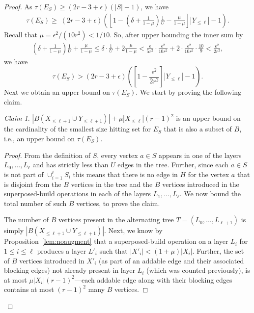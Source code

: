 \documentclass[11pt]{article}
\theoremstyle{definition}
\theoremstyle{remark}
\newtheorem{claim}[theorem]{Claim}
\begin{document}
\begin{proof}
As $\tau(E_S) \geq (2r-3 + \epsilon)(|S|-1)$, we have 
\begin{align*}
 \tau(E_S) \geq \; (2r-3+\epsilon) \left(\left[1 - \left(\delta + \frac{1}{1-\mu}\right)\frac1U -\frac{\mu}{1-\mu} \right] |Y_{\leq \ell}|-1\right).
\end{align*}
Recall that $\mu = \epsilon^2/(10r^2) < 1/10$. So, after upper bounding the inner sum by
\begin{align*}
 \left(\delta + \frac{1}{1-\mu}\right)\frac1U +\frac{\mu}{1-\mu}  \leq \delta\cdot \frac1U + 2\frac{\mu}{1-\mu} < \frac{\epsilon}{5r^2}\cdot\frac{\epsilon^2}{10r^2} + 2\cdot\frac{\epsilon^2}{10r^2}\cdot\frac{10}{9} < \frac{\epsilon^2}{2r^2},
\end{align*}
we have 
\begin{equation}\label{eqn:largeHS2}
  \tau(E_S) > (2r-3+\epsilon)\left(\left[1 - \frac{\epsilon^2}{2r^2}\right] |Y_{\leq \ell}|-1\right).
\end{equation}
Next we obtain an upper bound on $\tau(E_S)$. We start by proving the following claim.

\begin{claim}\label{claim:local}
  $|B(X_{\leq \ell+1} \cup Y_{\leq \ell+1})| + \mu |X_{\leq
    \ell}|(r-1)^2$ is an upper bound on the cardinality of the
  smallest size hitting set for $E_S$ that is also a subset of $B$, i.e., an upper bound on $\tau(E_S)$.
\end{claim}
\begin{proof}
  From the definition of $S$, every vertex $a \in S$ appears in one of
  the layers $L_0,\dots,L_\ell$ and has strictly less than $U$ edges
  in the tree. Further, since each $a \in S$ is not part of
  $\cup_{i=1}^\ell S_i$ this means that there is no edge in $H$ for
  the vertex $a$ that is disjoint from the $B$ vertices in the tree
  and the $B$ vertices introduced in the superposed-build operations
  in each of the layers $L_1,\dots,L_\ell$. We now bound the total
  number of such $B$ vertices, to prove the claim.

The number of $B$ vertices present in the alternating tree
$T=(L_0,\dots,L_{\ell+1})$ is simply $|B(X_{\leq \ell+1} \cup Y_{\leq
  \ell+1})|$. Next, we know by Proposition~\ref{lem:noaugment} that a
superposed-build operation on a layer $L_i$ for $1\leq i\leq \ell$
produces a layer $L'_i$ such that $|X'_i| < (1+\mu) |X_i|$. Further,
the set of $B$ vertices introduced in $X'_i$ (as part of an addable
edge and their associated blocking edges) not already present in layer
$L_i$ (which was counted previously), is at most
$\mu|X_i|(r-1)^2$---each addable edge along with their blocking edges
contains at most $(r-1)^2$ many $B$ vertices.
\end{proof}


\end{proof}
\end{document}
